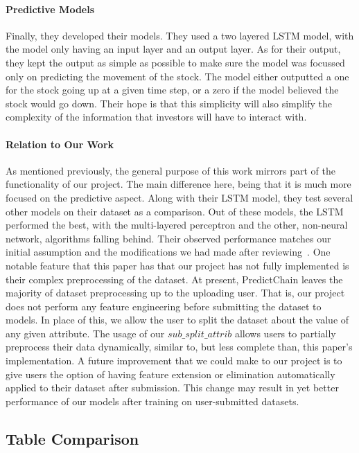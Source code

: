 \documentclass{article}
\begin{document}
    \paragraph{Predictive Models}
    Finally, they developed their models.  They used a two layered LSTM model, with the model only having an input layer
    and an output layer.  As for their output, they kept the output as simple as possible to make sure the model
    was focussed only on predicting the movement of the stock.  The model either outputted a one for the stock going up at
    a given time step, or a zero if the model believed the stock would go down.  Their hope is that this simplicity
    will also simplify the complexity of the information that investors will have to interact with.

    \paragraph{Relation to Our Work}
    As mentioned previously, the general purpose of this work mirrors part of the functionality of our project.
    The main difference here, being that it is much more focused on the predictive aspect.  Along with their
    LSTM model, they test several other models on their dataset as a comparison.  Out of these models,
    the LSTM performed the best, with the multi-layered perceptron and the other, non-neural network, algorithms
    falling behind.  Their observed performance matches our initial assumption and the modifications we had made
    after reviewing~\cite{recurrentModeling}. One notable feature that this paper has that our project has not fully implemented
    is their complex preprocessing of the dataset.  At present, PredictChain leaves the majority of dataset preprocessing
    up to the uploading user.  That is, our project does not perform any feature engineering before submitting the dataset
    to models.  In place of this, we allow the user to split the dataset about the value of any given attribute.  The usage
    of our $sub\_split\_attrib$ allows users to partially preprocess their data dynamically, similar to, but less complete
    than, this paper's implementation.  A future improvement that we could make to our project is to give users the option
    of having feature extension or elimination automatically applied to their dataset after submission.  This change may
    result in yet better performance of our models after training on user-submitted datasets.

    \subsection{Table Comparison}
\end{document}
